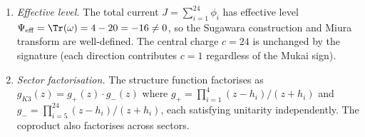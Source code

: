 \begin{proposition}
\begin{enumerate}[label=\textup{(\roman*)}]
\item \emph{Effective level.}
The total current $J = \sum_{i=1}^{24} \phi_i$ has effective level
$\Psi_{\mathrm{eff}} = \Tr(\omega) = 4 - 20 = -16 \neq 0$, so the
Sugawara construction and Miura transform are well-defined.
The central charge $c = 24$ is unchanged by the signature (each
direction contributes $c = 1$ regardless of the Mukai sign).

\item \emph{Sector factorisation.}
The structure function factorises as $g_{K3}(z) = g_+(z) \cdot g_-(z)$
where $g_+ = \prod_{i=1}^{4}(z-h_i)/(z+h_i)$ and
$g_- = \prod_{i=5}^{24}(z-h_i)/(z+h_i)$, each satisfying unitarity
independently. The coproduct also factorises across sectors.
\end{enumerate}
\end{proposition}

